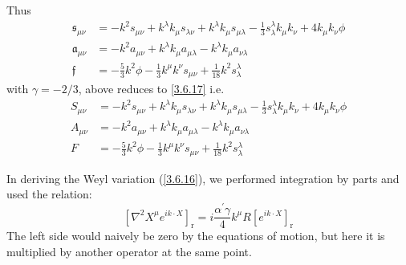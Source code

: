 \begin{tcolorbox}[breakable]
		Thus
		\begin{align}
			\mathfrak{s}_{\mu \nu} &= -k^2 s_{\mu \nu} + k^\lambda k_\mu s_{\lambda \nu} + k^\lambda k_\mu s_{\mu \lambda} - \frac{1}{3} s_\lambda^\lambda k_\mu k_\nu + 4 k_\mu k_\nu \phi \\
			\mathfrak{a}_{\mu \nu} &= -k^2 a_{\mu \nu} + k^\lambda k_\mu a_{\mu \lambda} - k^\lambda k_\mu a_{\nu \lambda} \\
			\mathfrak{f} &= -\frac{5}{3} k^2 \phi - \frac{1}{3} k^\mu k^\nu s_{\mu \nu} + \frac{1}{18} k^2 s_\lambda^\lambda
		\end{align}
		with $\gamma = -2/3$, above reduces to \eqref{3.6.17} i.e.
		\begin{align}
			S_{\mu \nu} &= -k^2 s_{\mu \nu} + k^\lambda k_\mu s_{\lambda \nu} + k^\lambda k_\mu s_{\mu \lambda} - \frac{1}{3} s_\lambda^\lambda k_\mu k_\nu + 4 k_\mu k_\nu \phi \\
			A_{\mu \nu} &= -k^2 a_{\mu \nu} + k^\lambda k_\mu a_{\mu \lambda} - k^\lambda k_\mu a_{\nu \lambda} \\
			F &= -\frac{5}{3} k^2 \phi - \frac{1}{3} k^\mu k^\nu s_{\mu \nu} + \frac{1}{18} k^2 s_\lambda^\lambda
		\end{align}
		
\end{tcolorbox}
In deriving the Weyl variation (\ref{3.6.16}), we performed integration by parts and used the relation:
\begin{equation}\label{3.6.18}
	\left[\nabla^{2} X^{\mu} e^{i k \cdot X}\right]_{\mathrm{r}}=i \frac{\alpha^{\prime} \gamma}{4} k^{\mu} R\left[e^{i k \cdot X}\right]_{\mathrm{r}}
\end{equation}
The left side would naively be zero by the equations of motion, but here it is multiplied by another operator at the same point.
